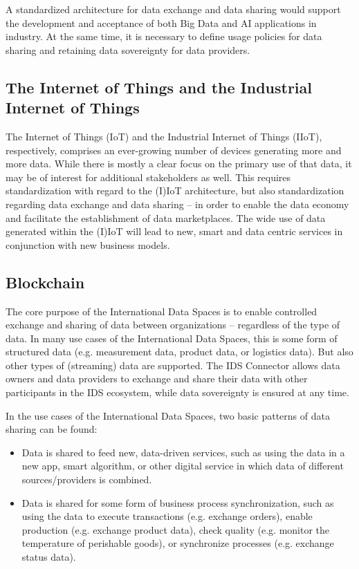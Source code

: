 A standardized architecture for data exchange and data sharing would support the development and acceptance of both Big Data and AI applications in industry. At the same time, it is necessary to define usage policies for data sharing and retaining data sovereignty for data providers. 



\subsection{The Internet of Things and the Industrial Internet of Things}\label{subsec:iiot}
The Internet of Things (IoT) and the Industrial Internet of Things (IIoT), respectively, comprises an ever-growing number of devices generating more and more data. While there is mostly a clear focus on the primary use of that data, it may be of interest for additional stakeholders as well. This requires standardization with regard to the (I)IoT architecture, but also standardization regarding data exchange and data sharing – in order to enable the data economy and facilitate the establishment of data marketplaces. The wide use of data generated within the (I)IoT will lead to new, smart and data centric services in conjunction with new business models.

\subsection{Blockchain}\label{subsec:blockchain}
The core purpose of the International Data Spaces is to enable controlled exchange and sharing of data between organizations – regardless of the type of data. In many use cases of the International Data Spaces, this is some form of structured data (e.g. measurement data, product data, or logistics data). But also other types of (streaming) data are supported. The IDS Connector allows data owners and data providers to exchange and share their data with other participants in the IDS ecosystem, while data sovereignty is ensured at any time. 

In the use cases of the International Data Spaces, two basic patterns of data sharing can be found: 

\begin{itemize}
	\item Data is shared to feed new, data-driven services, such as using the data in a new app, smart algorithm, or other digital service in which data of different sources/providers is combined. 

	\item Data is shared for some form of business process synchronization, such as using the data to execute transactions (e.g. exchange orders), enable production (e.g. exchange product data), check quality (e.g. monitor the temperature of perishable goods), or synchronize processes (e.g. exchange status data). 
\end{itemize}

